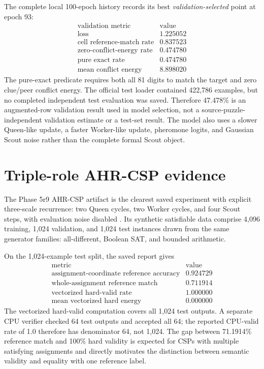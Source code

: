 \documentclass[11pt,oneside]{book}
\theoremstyle{remark}
\begin{document}
The complete local 100-epoch history records its best
\emph{validation-selected} point at epoch 93:
\[
\begin{array}{l|r}
\text{validation metric}&\text{value}\\
\hline
\text{loss}&1.225052\\
\text{cell reference-match rate}&0.837523\\
\text{zero-conflict-energy rate}&0.474780\\
\text{pure exact rate}&0.474780\\
\text{mean conflict energy}&8.898020
\end{array}
\]
The pure-exact predicate requires both all 81 digits to match the target and
zero clue/peer conflict energy. The official test loader contained 422,786
examples, but no completed independent test evaluation was saved. Therefore
47.478\% is an augmented-row validation result used in model selection, not a
source-puzzle-independent validation estimate or a test-set result.
The model also uses a slower Queen-like update, a faster Worker-like update,
pheromone logits, and Gaussian Scout noise rather than the complete formal
Scout object.

\section{Triple-role AHR-CSP evidence}

The Phase 5r9 AHR-CSP artifact is the clearest saved experiment with explicit
three-scale recurrence: two Queen cycles, two Worker cycles, and four Scout
steps, with evaluation noise disabled
\cite{FalkenburgAHRCSPPhase5r9}. Its synthetic satisfiable data comprise 4,096
training, 1,024 validation, and 1,024 test instances drawn from the same
generator families: all-different, Boolean SAT, and bounded arithmetic.

On the 1,024-example test split, the saved report gives
\[
\begin{array}{l|r}
\text{metric}&\text{value}\\
\hline
\text{assignment-coordinate reference accuracy}&0.924729\\
\text{whole-assignment reference match}&0.711914\\
\text{vectorized hard-valid rate}&1.000000\\
\text{mean vectorized hard energy}&0.000000
\end{array}
\]
The vectorized hard-valid computation covers all 1,024 test outputs. A
separate CPU verifier checked 64 test outputs and accepted all 64; the reported
CPU-valid rate of 1.0 therefore has denominator 64, not 1,024. The gap between
71.1914\% reference match and 100\% hard validity is expected for CSPs with
multiple satisfying assignments and directly motivates the distinction
between semantic validity and equality with one reference label.
\end{document}
